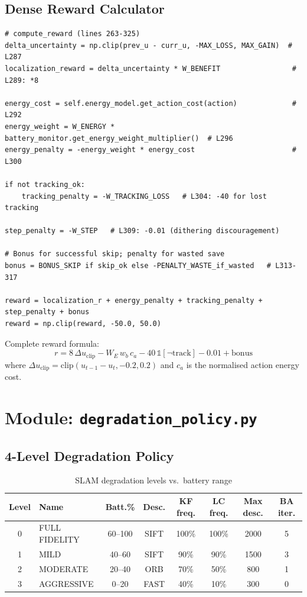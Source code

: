 \documentclass[12pt,a4paper,twoside]{report}
\theoremstyle{definition}
\begin{document}
\section{Dense Reward Calculator}

\begin{lstlisting}
# compute_reward (lines 263-325)
delta_uncertainty = np.clip(prev_u - curr_u, -MAX_LOSS, MAX_GAIN)  # L287
localization_reward = delta_uncertainty * W_BENEFIT                 # L289: *8

energy_cost = self.energy_model.get_action_cost(action)             # L292
energy_weight = W_ENERGY * battery_monitor.get_energy_weight_multiplier()  # L296
energy_penalty = -energy_weight * energy_cost                       # L300

if not tracking_ok:
    tracking_penalty = -W_TRACKING_LOSS   # L304: -40 for lost tracking

step_penalty = -W_STEP   # L309: -0.01 (dithering discouragement)

# Bonus for successful skip; penalty for wasted save
bonus = BONUS_SKIP if skip_ok else -PENALTY_WASTE_if_wasted   # L313-317

reward = localization_r + energy_penalty + tracking_penalty + step_penalty + bonus
reward = np.clip(reward, -50.0, 50.0)
\end{lstlisting}

Complete reward formula:
\[
  r = 8\,\Delta u_{\text{clip}} - W_E\,w_b\,c_a - 40\,\mathbb{1}[\neg\text{track}] - 0.01 + \text{bonus}
\]
where $\Delta u_{\text{clip}} = \text{clip}(u_{t-1}-u_t, -0.2, 0.2)$ and
$c_a$ is the normalised action energy cost.

\chapter{Module: \texttt{degradation\_policy.py}}

\section{4-Level Degradation Policy}

\begin{table}[H]
\centering
\caption{SLAM degradation levels vs.\ battery range}\label{tab:degrad}
\begin{tabular}{clcccccc}
\toprule
\textbf{Level} & \textbf{Name} & \textbf{Batt.\%} & \textbf{Desc.} & \textbf{KF freq.} & \textbf{LC freq.} & \textbf{Max desc.} & \textbf{BA iter.} \\
\midrule
0 & FULL FIDELITY & 60--100 & SIFT & 100\% & 100\% & 2000 & 5 \\
1 & MILD & 40--60 & SIFT & 90\% & 90\% & 1500 & 3 \\
2 & MODERATE & 20--40 & ORB & 70\% & 50\% & 800 & 1 \\
3 & AGGRESSIVE & 0--20 & FAST & 40\% & 10\% & 300 & 0 \\
\bottomrule
\end{tabular}
\end{table}
\end{document}
